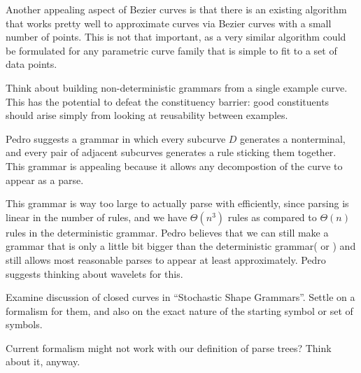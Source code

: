 \documentclass{article}
\begin{document}
  Another appealing aspect of Bezier curves is that there is an
  existing algorithm that works pretty well to approximate curves via
  Bezier curves with a small number of points. This is not that
  important, as a very similar algorithm could be formulated for any
  parametric curve family that is simple to fit to a set of data
  points.
  
\item Think about building non-deterministic grammars from a single
  example curve. This has the potential to defeat the constituency
  barrier: good constituents should arise simply from looking at
  reusability between examples.

  Pedro suggests a grammar in which every subcurve $D$ generates a
  nonterminal, and every pair of adjacent subcurves generates a rule
  sticking them together. This grammar is appealing because it allows
  any decompostion of the curve to appear as a parse.

  This grammar is way too large to actually parse with efficiently,
  since parsing is linear in the number of rules, and we have
  $\Theta(n^3)$ rules as compared to $\Theta(n)$ rules in the
  deterministic grammar. Pedro believes that we can still make a
  grammar that is only a little bit bigger than the deterministic
  grammar( or ) and still allows most
  reasonable parses to appear at least approximately. Pedro suggests
  thinking about wavelets for this.

  

\item Examine discussion of closed curves in ``Stochastic Shape
  Grammars''. Settle on a formalism for them, and also on the exact
  nature of the starting symbol or set of symbols.

  Current formalism might not work with our definition of parse trees? Think about it, anyway.
\end{document}
